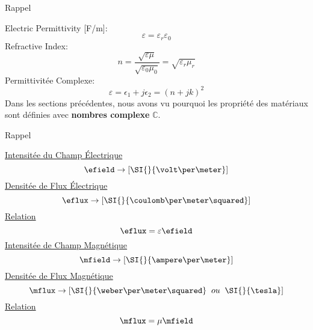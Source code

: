 \begin{frame}{Rappel}
    \begin{twocolumns}[0.4]
        \leftcol
            Electric Permittivity [F/m]:
            \begin{equation*}
                \varepsilon =\varepsilon_r \varepsilon_0
            \end{equation*}
            Refractive Index:
            \begin{equation*}
                n =\frac{\sqrt{\varepsilon \mu}}{\sqrt{\varepsilon_0 \mu_0}} = \sqrt{\varepsilon_r \mu_r}
            \end{equation*}
            Permittivitée Complexe:
            \begin{equation*}
                \varepsilon = \epsilon_1 + j \epsilon_2 = (n+jk)^2
            \end{equation*}
        \rightcol
            Dans les sections précédentes, nous avons vu pourquoi les propriété des matériaux sont définies avec \textbf{nombres complexe} $\mathbb{C}$.
    \end{twocolumns}
\end{frame}

\begin{frame}{Rappel}
    \centering
    \begin{twocolumns}[0.4]
        \leftcol
            \centering
            \underline{Intensitée du Champ Électrique}
            \begin{equation*}
                \efield \rightarrow [\SI{}{\volt\per\meter}]
            \end{equation*}
            \underline{Densitée de Flux Électrique}
            \begin{equation*}
                \eflux \rightarrow [\SI{}{\coulomb\per\meter\squared}]
            \end{equation*}
            \underline{Relation}
            \begin{equation*}
                \eflux = \varepsilon \efield
            \end{equation*}
        \rightcol
            \centering
            \underline{Intensitée de Champ Magnétique}
            \begin{equation*}
                \mfield \rightarrow [\SI{}{\ampere\per\meter}]
            \end{equation*}
            \underline{Densitée de Flux Magnétique}
            \begin{equation*}
                \mflux \rightarrow [\SI{}{\weber\per\meter\squared} \;\; ou \;\; \SI{}{\tesla}]
            \end{equation*}
            \underline{Relation}
            \begin{equation*}
                \mflux = \mu \mfield
            \end{equation*}
    \end{twocolumns}
\end{frame}



